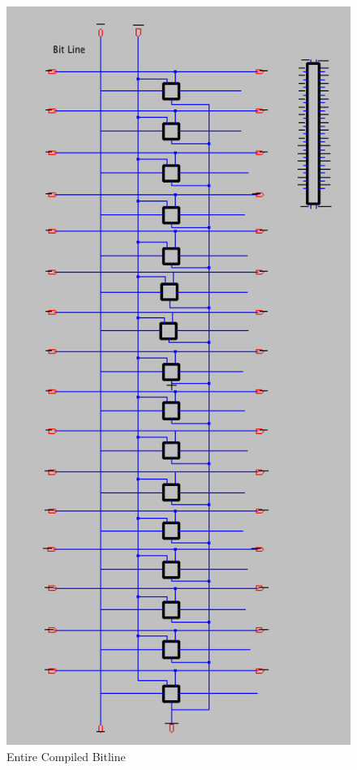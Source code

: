 \documentclass[a4paper]{article}
\begin{document}
\begin{figure}[H]
	\centering
	\includegraphics[scale=0.8]{bitLineSchematicZoomedOut}
	\caption{Entire Compiled Bitline}
	\label{fig:bitlineLongSchematic1}
\end{figure}
\end{document}
